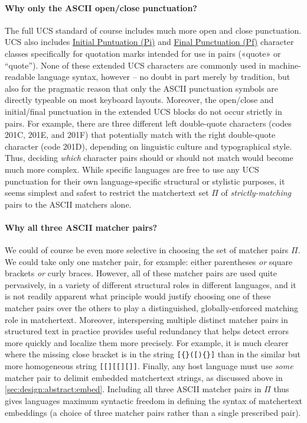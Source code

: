 \paragraph{Why only the ASCII open/close punctuation?}
The full UCS standard of course includes
much more open and close punctuation.
UCS also includes
\href{https://www.compart.com/en/unicode/category/Pi}{Initial Puntuation (Pi)}
and 
\href{https://www.compart.com/en/unicode/category/Pf}{Final Punctuation (Pf)}
character classes specifically for quotation marks
intended for use in pairs
(\eg «quote» or “quote”).
None of these extended UCS characters are commonly used
in machine-readable language syntax, however --
no doubt in part merely by tradition,
but also for the pragmatic reason that only the ASCII punctuation symbols
are directly typeable on most keyboard layouts.
Moreover, the open/close and initial/final punctuation
in the extended UCS blocks
do not occur strictly in pairs.
For example,
there are three different left double-quote characters
(codes 201C, 201E, and 201F)
that potentially match with the right double-quote character (code 201D),
depending on linguistic culture and typographical style.
Thus, deciding \emph{which} character pairs should or should not match
would become much more complex.
While specific languages are free to use any UCS punctuation
for their own language-specific structural or stylistic purposes,
it seems simplest and safest to restrict the matchertext set $\Pi$ of
\emph{strictly-matching} pairs to the ASCII matchers alone.

\paragraph{Why all three ASCII matcher pairs?}

We could of course be even more selective
in choosing the set of matcher pairs $\Pi$.
We could take only one matcher pair, for example:
either parentheses \emph{or} square brackets \emph{or} curly braces.
However, all of these matcher pairs are used quite pervasively,
in a variety of different structural roles in different languages,
and it is not readily apparent what principle would justify
choosing one of these matcher pairs over the others
to play a distinguished, globally-enforced matching role in matchertext.
Moreover, interspersing multiple distinct matcher pairs in structured text
in practice provides useful redundancy
that helps detect errors more quickly and localize them more precisely.
For example, it is much clearer where the missing close bracket is
in the string \verb|[{}([){}]|
than in the similar but more homogeneous string \verb|[[][[][]]|.
Finally,
any host language must use \emph{some} matcher pair
to delimit embedded matchertext strings,
as discussed above in \cref{sec:design:abstract:embed}.
Including all three ASCII matcher pairs in $\Pi$
thus gives languages maximum syntactic freedom
in defining the syntax of matchertext embeddings
(\ie a choice of three matcher pairs rather than a single prescribed pair).


